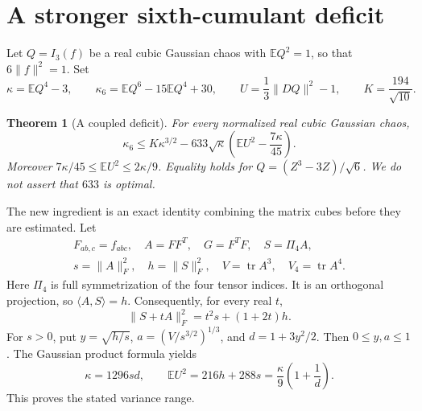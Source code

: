 \documentclass[11pt]{article}
\newtheorem{theorem}{Theorem}
\newcommand{\E}{\mathbb E}
\newcommand{\tr}{\operatorname{tr}}
\newcommand{\ip}[2]{\langle #1,#2\rangle}
\newcommand{\norm}[1]{\lVert #1\rVert}
\begin{document}
\section{A stronger sixth-cumulant deficit}
Let $Q=I_3(f)$ be a real cubic Gaussian chaos with $\E Q^2=1$, so that $6\norm f^2=1$. Set
\begin{equation}\label{eq:moment-defs}
 \kappa=\E Q^4-3,\qquad
 \kappa_6=\E Q^6-15\E Q^4+30,\qquad
 U=\frac13\norm{DQ}^2-1,
 \qquad K=\frac{194}{\sqrt{10}}.
\end{equation}
\begin{theorem}[A coupled deficit]\label{thm:633}
For every normalized real cubic Gaussian chaos,
\begin{equation}\label{eq:deficit633}
 \boxed{\quad
 \kappa_6\le K\kappa^{3/2}
 -633\sqrt\kappa\left(\E U^2-\frac{7\kappa}{45}\right).
 \quad}
\end{equation}
Moreover $7\kappa/45\le\E U^2\le2\kappa/9$. Equality holds for $Q=(Z^3-3Z)/\sqrt6$. We do not assert that $633$ is optimal.
\end{theorem}

The new ingredient is an exact identity combining the matrix cubes before they are estimated. Let
\begin{equation}\label{eq:tensor-defs}
 \begin{gathered}
 F_{ab,c}=f_{abc},\quad A=FF^T,\quad G=F^TF,\quad S=\Pi_4A,\\
 s=\norm A_F^2,\quad h=\norm S_F^2,\quad V=\tr A^3,\quad V_4=\tr A^4.
 \end{gathered}
\end{equation}
Here $\Pi_4$ is full symmetrization of the four tensor indices. It is an orthogonal projection, so $\ip AS=h$. Consequently, for every real $t$,
\begin{equation}\label{eq:cube-norms}
 \norm{S+tA}_F^2=t^2s+(1+2t)h.
\end{equation}
For $s>0$, put $y=\sqrt{h/s}$, $a=(V/s^{3/2})^{1/3}$, and $d=1+3y^2/2$. Then $0\le y,a\le1$. The Gaussian product formula yields
\begin{equation}\label{eq:cubic-products}
 \kappa=1296sd,\qquad
 \E U^2=216h+288s=\frac\kappa9\left(1+\frac1d\right).
\end{equation}
This proves the stated variance range.
\end{document}
